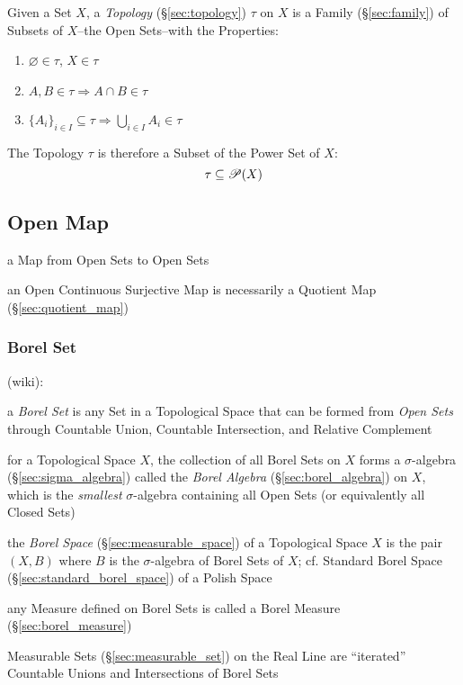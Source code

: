 Given a Set $X$, a \emph{Topology} (\S\ref{sec:topology}) $\tau$ on $X$ is a
Family (\S\ref{sec:family}) of Subsets of $X$--the Open Sets--with the
Properties:
\begin{enumerate}
  \item $\varnothing \in \tau$, $X \in \tau$
  \item $A,B \in \tau \Rightarrow A \cap B \in \tau$
  \item $\{A_i\}_{i \in I} \subseteq \tau \Rightarrow \bigcup_{i \in
  I} A_i \in \tau$
\end{enumerate}
The Topology $\tau$ is therefore a Subset of the Power Set of $X$:
\[
  \tau \subseteq \mathscr{P}(X)
\]



\subsection{Open Map}\label{sec:open_map}

a Map from Open Sets to Open Sets

an Open Continuous Surjective Map is necessarily a Quotient Map
(\S\ref{sec:quotient_map})



\subsubsection{Borel Set}\label{sec:borel_set}

(wiki):

a \emph{Borel Set} is any Set in a Topological Space that can be formed from
\emph{Open Sets} through Countable Union, Countable Intersection, and Relative
Complement

for a Topological Space $X$, the collection of all Borel Sets on $X$ forms a
$\sigma$-algebra (\S\ref{sec:sigma_algebra}) called the \emph{Borel Algebra}
(\S\ref{sec:borel_algebra}) on $X$, which is the \emph{smallest}
$\sigma$-algebra containing all Open Sets (or equivalently all Closed Sets)

the \emph{Borel Space} (\S\ref{sec:measurable_space}) of a Topological Space $X$
is the pair $(X,B)$ where $B$ is the $\sigma$-algebra of Borel Sets of $X$; cf.
Standard Borel Space (\S\ref{sec:standard_borel_space}) of a Polish Space

any Measure defined on Borel Sets is called a Borel Measure
(\S\ref{sec:borel_measure})

Measurable Sets (\S\ref{sec:measurable_set}) on the Real Line are ``iterated''
Countable Unions and Intersections of Borel Sets

